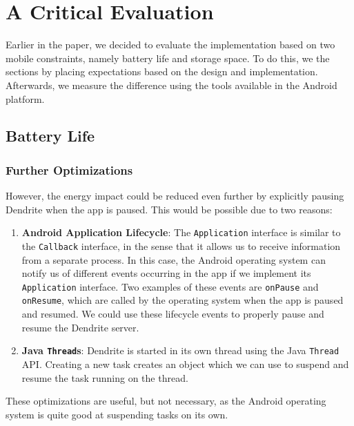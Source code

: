 \chapter{A Critical Evaluation}\label{chp:a_critical_evaluation}
Earlier in the paper, we decided to evaluate the implementation based on two mobile constraints, namely battery life and storage space.
To do this, we the sections by placing expectations based on the design and implementation.
Afterwards, we measure the difference using the tools available in the Android platform.

\section{Battery Life}\label{sec:battery_life}

\subsection{Further Optimizations}
However, the energy impact could be reduced even further by explicitly pausing Dendrite when the app is paused.
This would be possible due to two reasons:
\begin{enumerate}
	\item{
	      \textbf{Android Application Lifecycle}:
	      The \texttt{Application} interface is similar to the \texttt{Callback} interface, in the sense that it allows us to receive information from a separate process.
	      In this case, the Android operating system can notify us of different events occurring in the app if we implement its \texttt{Application} interface.
	      Two examples of these events are \texttt{onPause} and \texttt{onResume}, which are called by the operating system when the app is paused and resumed.
	      We could use these lifecycle events to properly pause and resume the Dendrite server.
	      }
	\item{
	      \textbf{Java \texttt{Thread}s}:
	      Dendrite is started in its own thread using the Java \texttt{Thread} \ac{API}\@.
	      Creating a new task creates an object which we can use to suspend and resume the task running on the thread.
	      }
\end{enumerate}

These optimizations are useful, but not necessary, as the Android operating system is quite good at suspending tasks on its own.

